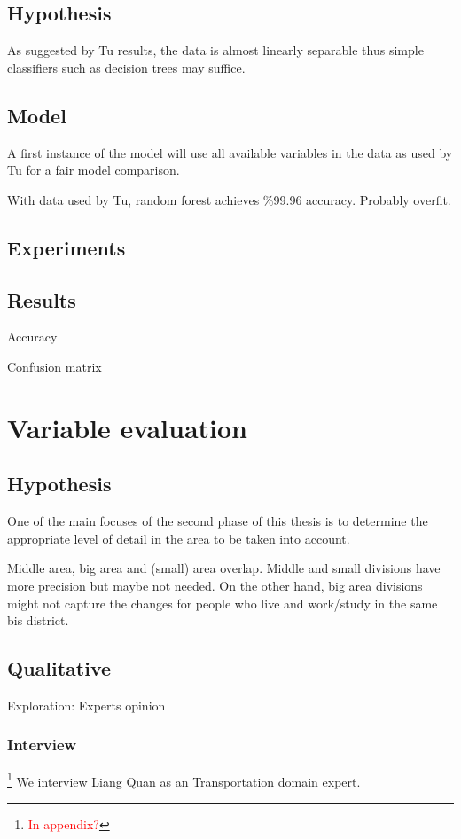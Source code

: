 \documentclass{article}
\newcommand{\selfnote}[1]{\footnote{\textcolor{red}{#1}}}
\begin{document}
\subsection{Hypothesis}
As suggested by Tu \cite{tu2016impact} results, the data is almost linearly separable thus simple classifiers such as decision trees may suffice. 


\subsection{Model}
A first instance of the model will use all available variables in the data as used by Tu \cite{tu2016impact} for a fair model comparison. 

With data used by Tu\cite{tu2016impact}, random forest achieves \%99.96 accuracy. Probably overfit.

\subsection{Experiments}

\subsection{Results}

Accuracy

Confusion matrix


\newpage
\section{Variable evaluation}
\subsection{Hypothesis}
One of the main focuses of the second phase of this thesis is to determine the appropriate level of detail in the area to be taken into account. 

Middle area, big area and (small) area overlap. Middle and small divisions have more precision but maybe not needed. On the other hand, big area divisions might not capture the changes for people who live and work/study in the same bis district. 

\subsection{Qualitative}
Exploration: Experts opinion

\subsubsection{Interview}
\selfnote{In appendix?}
We interview Liang Quan as an Transportation domain expert. 
\end{document}
